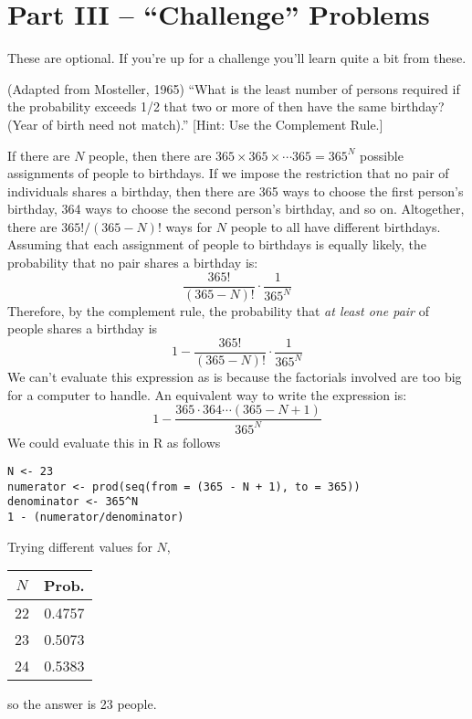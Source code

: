\documentclass[addpoints,12pt]{exam}
\begin{document}
\section*{Part III -- ``Challenge'' Problems}
These are optional. If you're up for a challenge you'll learn quite a bit from these.
\begin{questions}

\question (Adapted from Mosteller, 1965) ``What is the least number of persons required if the probability exceeds 1/2 that two or more of then have the same birthday? (Year of birth need not match).''
	[Hint: Use the Complement Rule.]
	\begin{solution}
If there are $N$ people, then there are $365 \times 365 \times \cdots 365 = 365^N$ possible assignments of people to birthdays. If we impose the restriction that no pair of individuals shares a birthday, then there are 365 ways to choose the first person's birthday, 364 ways to choose the second person's birthday, and so on. Altogether, there are $365!/(365 - N)!$ ways for $N$ people to all have different birthdays. Assuming that each assignment of people to birthdays is equally likely, the probability that no pair shares a birthday is:
		$$\frac{365!}{(365 - N)!} \cdot \frac{1}{365^N}$$
Therefore, by the complement rule, the probability that \emph{at least one pair} of people shares a birthday is
	$$1 - \frac{365!}{(365 - N)!} \cdot \frac{1}{365^N}$$
We can't evaluate this expression as is because the factorials involved are too big for a computer to handle. An equivalent way to write the expression is:
	$$1 - \frac{365 \cdot 364 \cdots \left(365 - N + 1\right)}{365^N}$$
We could evaluate this in R as follows
\begin{verbatim}
N <- 23
numerator <- prod(seq(from = (365 - N + 1), to = 365))
denominator <- 365^N
1 - (numerator/denominator)
	\end{verbatim}
Trying different values for $N$,
	\begin{center}
	\begin{tabular}{cc}
	$N$ & Prob.\\
	\hline
22   &  0.4757\\
23   &  0.5073\\
24   &  0.5383
	\end{tabular}
	\end{center}
so the answer is 23 people.
	\end{solution}
	

\end{questions}
\end{document}
